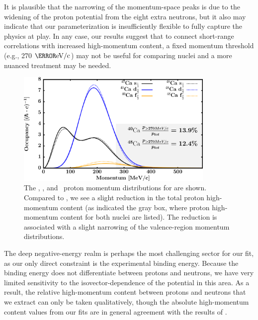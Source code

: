 It is plausible that the narrowing of the
momentum-space peaks is due to the widening of the proton potential
from the eight extra neutrons, but it also may indicate that our
parameterization is insufficiently flexible to fully capture the physics at play. In any
case, our results suggest that to connect
short-range correlations with increased high-momentum content,
a fixed momentum threshold (e.g., 270 $\mega\electronvolt/\text{c}$) may not be
useful for comparing nuclei and a more nuanced treatment may be needed.
\begin{figure}[tb]
    \centering
    \includegraphics[width=0.85\textwidth]{figures/CaMomenta.png}
    \caption[Proton momentum distributions in \caAughtEight]
    {
        The \sOne, \dFive, and \fSeven\ proton momentum distributions for
        \caAughtEight are shown. Compared to \caForty, we see a slight reduction
        in the total \caEight proton high-momentum content (as indicated the
        gray box, where proton high-momentum content for both nuclei are
        listed). The reduction is associated with a slight narrowing of the
        valence-region momentum distributions.
    }
    \label{CaProtonElasticReproduced}
\end{figure}

The deep negative-energy realm is perhaps the most challenging sector for our fit,
as our only direct constraint is the experimental binding energy. Because the
binding energy does not differentiate between protons and neutrons, we have
very limited sensitivity to the isovector-dependence of the potential in
this area. As a result, the relative high-momentum content between protons and
neutrons that we extract can only be taken qualitatively, though the absolute
high-momentum content values from our fits are in general agreement with the
results of \cite{Rohe2004, RoheHabilitation}.

